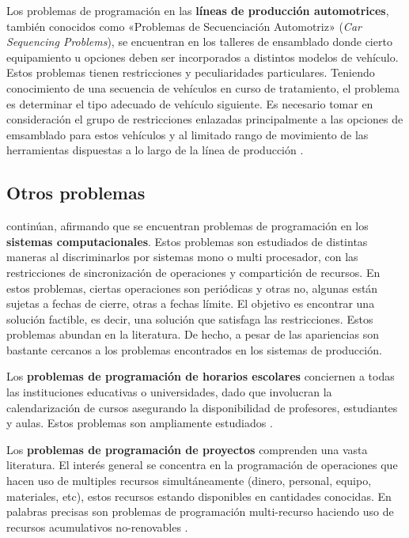 \documentclass[spanish,draft,12pt,headsepline,footsepline,paper=letter]{scrreprt}
\begin{document}
Los problemas de programación en las \textbf{líneas de producción automotrices}, también conocidos como «Problemas de Secuenciación Automotriz» (\textit{Car Sequencing Problems}), se encuentran en los talleres de ensamblado donde cierto equipamiento u opciones deben ser incorporados a distintos modelos de vehículo. Estos problemas tienen restricciones y peculiaridades particulares. Teniendo conocimiento de una secuencia de vehículos en curso de tratamiento, el problema es determinar el tipo adecuado de vehículo siguiente. Es necesario tomar en consideración el grupo de restricciones enlazadas principalmente a las opciones de emsamblado para estos vehículos y al limitado rango de movimiento de las herramientas dispuestas a lo largo de la línea de producción \citep[p.~7]{TKindt2002}.

\subsection{Otros problemas}
\label{otros_problemas}

\citet[p.~7]{TKindt2002} continúan, afirmando que se encuentran problemas de programación en los \textbf{sistemas computacionales}. Estos problemas son estudiados de distintas maneras al discriminarlos por sistemas mono o multi procesador, con las restricciones de sincronización de operaciones y compartición de recursos. En estos problemas, ciertas operaciones son periódicas y otras no, algunas están sujetas a fechas de cierre, otras a fechas límite. El objetivo es encontrar una solución factible, es decir, una solución que satisfaga las restricciones. Estos problemas abundan en la literatura. De hecho, a pesar de las apariencias son bastante cercanos a los problemas encontrados en los sistemas de producción.

Los \textbf{problemas de programación de horarios escolares} conciernen a todas las instituciones educativas o universidades, dado que involucran la calendarización de cursos asegurando la disponibilidad de profesores, estudiantes y aulas. Estos problemas son ampliamente estudiados \citep[p.~7]{TKindt2002}.

Los \textbf{problemas de programación de proyectos} comprenden una vasta literatura. El interés general se concentra en la programación de operaciones que hacen uso de multiples recursos simultáneamente (dinero, personal, equipo, materiales, etc), estos recursos estando disponibles en cantidades conocidas. En palabras precisas son problemas de programación multi-recurso haciendo uso de recursos acumulativos no-renovables \citep[p.~7]{TKindt2002}.
\end{document}
